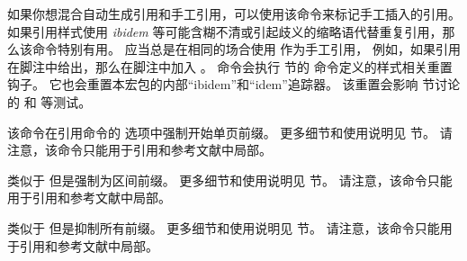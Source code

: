 \begin{ltxsyntax}
如果你想混合自动生成引用和手工引用，可以使用该命令来标记手工插入的引用。
如果引用样式使用 \emph{ibidem} 等可能含糊不清或引起歧义的缩略语代替重复引用，那么该命令特别有用。
应当总是在相同的场合使用  作为手工引用，
例如，如果引用在脚注中给出，那么在脚注中加入 。
 命令会执行  节的  命令定义的样式相关重置钩子。
它也会重置本宏包的内部“ibidem”和“idem”追踪器。
该重置会影响  节讨论的  和  等测试。



该命令在引用命令的  选项中强制开始单页前缀。
更多细节和使用说明见  节。
请注意，该命令只能用于引用和参考文献中局部。



类似于  但是强制为区间前缀。
更多细节和使用说明见  节。
请注意，该命令只能用于引用和参考文献中局部。



类似于  但是抑制所有前缀。
更多细节和使用说明见  节。
请注意，该命令只能用于引用和参考文献中局部。




\end{ltxsyntax}
